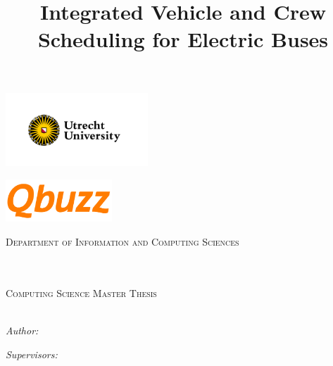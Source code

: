\documentclass[./main.tex]{subfiles}
\begin{document}
\title{Integrated Vehicle and Crew Scheduling for Electric Buses}

\makeatletter
\begin{titlepage}
    \begin{center}

    \vspace*{.02\textheight}
    {\includegraphics[align=c, width=0.4\textwidth]{images/uulogo.png}}%
    {\includegraphics[align=c, width=0.3\textwidth]{images/qbuzzlogo.png}\par}%
    \textsc{\Large Department of Information and Computing Sciences}\\[0.5cm] %

    \HRule \\[0.4cm] %
    {\huge \bfseries \@title \par}\vspace{0.4cm}
    \HRule \\[0.5cm] %

    {\Large \textsc{
        Computing Science Master Thesis \\[0.2cm]
        \large{\@studentnumber}
    }} \\[5.5cm]


    \begin{minipage}[t]{0.4\textwidth}
        \begin{flushleft} \large
            \emph{Author:}\\
            \@author
        \end{flushleft}
    \end{minipage}
    \begin{minipage}[t]{0.4\textwidth}
        \begin{flushright} \large
            \emph{Supervisors:} 


\end{flushright}
\end{minipage}
\end{center}
\end{titlepage}
\end{document}
